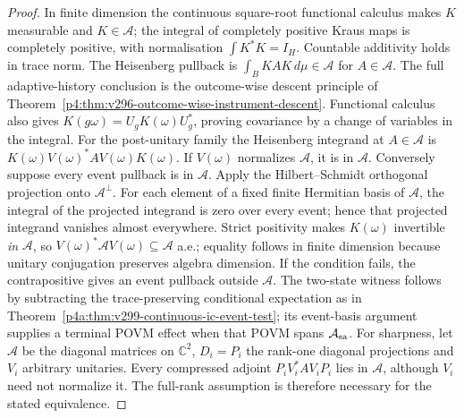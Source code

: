 \documentclass[12pt,a4paper]{article}
\begin{document}
\begin{proof}
In finite dimension the continuous square-root functional calculus
makes $K$ measurable and $K\in\mathcal A$; the integral of completely
positive Kraus maps is completely positive, with normalisation
$\int K^*K=I_H$. Countable additivity holds in trace norm. The
Heisenberg pullback is $\int_B KAK\,d\mu\in\mathcal A$ for
$A\in\mathcal A$. The full adaptive-history conclusion is the
outcome-wise descent principle of
Theorem~\ref{p4:thm:v296-outcome-wise-instrument-descent}.
Functional calculus also gives
$K(g\omega)=U_gK(\omega)U_g^*$, proving covariance by a change of
variables in the integral.
For the post-unitary family the Heisenberg integrand at $A\in\mathcal A$
is $K(\omega)V(\omega)^*AV(\omega)K(\omega)$.
If $V(\omega)$ normalizes $\mathcal A$, it is in $\mathcal A$.
Conversely suppose every event pullback is in $\mathcal A$. Apply
the Hilbert--Schmidt orthogonal projection onto $\mathcal A^\perp$.
For each element of a fixed finite Hermitian basis of $\mathcal A$,
the integral of the projected integrand is zero over every event;
hence that projected integrand vanishes almost everywhere. Strict
positivity makes $K(\omega)$ invertible \emph{in} $\mathcal A$, so
$V(\omega)^*\mathcal A V(\omega)\subseteq\mathcal A$ a.e.; equality
follows in finite dimension because unitary conjugation preserves
algebra dimension. If the condition fails, the contrapositive gives
an event pullback outside $\mathcal A$. The two-state witness follows
by subtracting the trace-preserving conditional expectation as in
Theorem~\ref{p4a:thm:v299-continuous-ic-event-test}; its event-basis
argument supplies a terminal POVM effect when that POVM spans
$\mathcal A_{\rm sa}$. For sharpness, let $\mathcal A$ be the
diagonal matrices on $\mathbb C^2$, $D_i=P_i$ the rank-one diagonal
projections and $V_i$ arbitrary unitaries. Every compressed adjoint
$P_iV_i^*AV_iP_i$ lies in $\mathcal A$, although $V_i$ need not
normalize it. The full-rank assumption is therefore necessary for
the stated equivalence.
\end{proof}
\end{document}
